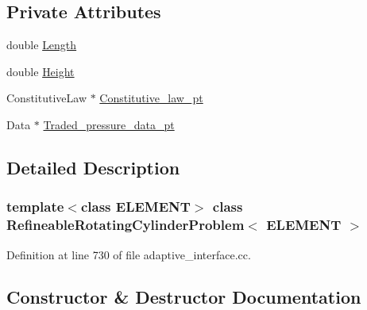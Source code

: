\subsection*{Private Attributes}
\begin{DoxyCompactItemize}
\item 
double \hyperlink{classRefineableRotatingCylinderProblem_acfa616d36346f557244146d4b2db9197}{Length}
\item 
double \hyperlink{classRefineableRotatingCylinderProblem_a3521efd0bfad036e20a6a8ba7e4547f4}{Height}
\item 
Constitutive\+Law $\ast$ \hyperlink{classRefineableRotatingCylinderProblem_a4e832fa2d6e1faafd39425d132d732e2}{Constitutive\+\_\+law\+\_\+pt}
\item 
Data $\ast$ \hyperlink{classRefineableRotatingCylinderProblem_a712d1cdcab28b62e1df830ffe1818009}{Traded\+\_\+pressure\+\_\+data\+\_\+pt}
\end{DoxyCompactItemize}


\subsection{Detailed Description}
\subsubsection*{template$<$class E\+L\+E\+M\+E\+NT$>$\newline
class Refineable\+Rotating\+Cylinder\+Problem$<$ E\+L\+E\+M\+E\+N\+T $>$}



Definition at line 730 of file adaptive\+\_\+interface.\+cc.



\subsection{Constructor \& Destructor Documentation}
\mbox{\label{classRefineableRotatingCylinderProblem_aa597c4240ce9affbd7540998167c8f21}} 
